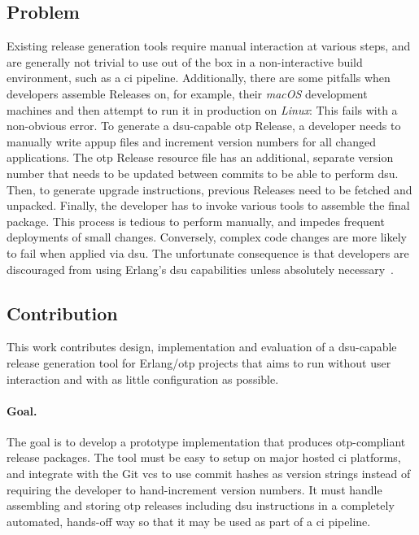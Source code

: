\subsection{Problem}\label{sec:problem} Existing release generation tools require manual interaction at various steps, and are generally not trivial to use out of the box in a non-interactive build environment, such as a \acrfull{ci} pipeline. Additionally, there are some pitfalls when developers assemble Releases on, for example, their \emph{macOS} development machines and then attempt to run it in production on \emph{Linux}: This fails with a non-obvious error. To generate a \acrshort{dsu}-capable \acrshort{otp} Release, a developer needs to manually write \acrshort{appup} files and increment version numbers for all changed applications. The \acrshort{otp} Release resource file has an additional, separate version number that needs to be updated between commits to be able to perform \acrshort{dsu}. Then, to generate upgrade instructions, previous Releases need to be fetched and unpacked. Finally, the developer has to invoke various tools to assemble the final package. This process is tedious to perform manually, and impedes frequent deployments of small changes. Conversely, complex code changes are more likely to fail when applied via \acrshort{dsu}. The unfortunate consequence is that developers are discouraged from using Erlang's \acrshort{dsu} capabilities unless absolutely necessary~\cite{ferd}.

\subsection{Contribution}

This work contributes design, implementation and evaluation of a \acrshort{dsu}-capable release generation tool for Erlang/\acrshort{otp} projects that aims to run without user interaction and with as little configuration as possible.

\paragraph{Goal.} The goal is to develop a prototype implementation that produces \acrshort{otp}-compliant release packages. The tool must be easy to setup on major hosted \acrshort{ci} platforms, and integrate with the Git \acrfull{vcs} to use commit hashes as version strings instead of requiring the developer to hand-increment version numbers. It must handle assembling and storing \acrshort{otp} releases including \acrshort{dsu} instructions in a completely automated, hands-off way so that it may be used as part of a \acrshort{ci} pipeline.

